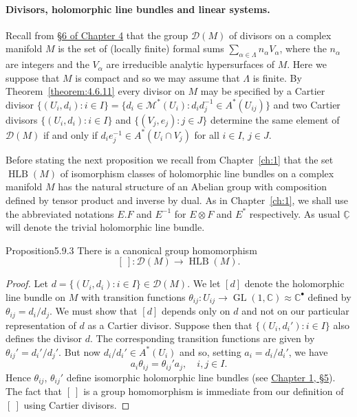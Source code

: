 \paragraph{Divisors, holomorphic line bundles and linear systems.}
Recall from \hyperref[sec:4:6]{\S6 of Chapter 4} that the group $\mathcal D(M)$ of divisors on a complex manifold $M$ is the set of (locally finite) formal sums $\sum_{\alpha\in\Lambda}n_\alpha V_\alpha$, where the $n_\alpha$ are integers and the $V_\alpha$ are irreducible analytic hypersurfaces of $M$. Here we suppose that $M$ is compact and so we may assume that $\Lambda$ is finite. By Theorem~\ref{theorem:4.6.11} every divisor on $M$ may be specified by a Cartier divisor $\{(U_i,d_i):i\in I\}=\{d_i\in\mathcal M^*(U_i):d_id_j^{-1}\in A^*(U_{ij})\}$ and two Cartier divisors $\{(U_i,d_i):i\in I\}$ and $\{(V_j,e_j):j\in J\}$ determine the same element of $\mathcal D(M)$ if and only if $d_ie_j^{-1}\in A^*(U_i\cap V_j)$ for all $i\in I$, $j\in J$.

Before stating the next proposition we recall from Chapter~\ref{ch:1} that the set $\operatorname{HLB}(M)$ of isomorphism classes of holomorphic line bundles on a complex manifold $M$ has the natural structure of an Abelian group with composition defined by tensor product and inverse by dual. As in Chapter~\ref{ch:1}, we shall use the abbreviated notations $E.F$ and $E^{-1}$ for $E\otimes F$ and $E^*$ respectively. As usual $\underline{\mathbb C}$ will denote the trivial holomorphic line bundle.
\begin{originaltheorem}{Proposition}{5.9.3}
There is a canonical group homomorphism
\[[\ ]:\mathcal D(M)\to\operatorname{HLB}(M).\]
\end{originaltheorem}
\begin{proof}
Let $d=\{(U_i,d_i):i\in I\}\in\mathcal D(M)$. We let $[d]$ denote the holomorphic line bundle on $M$ with transition functions $\theta_{ij}:U_{ij}\to\operatorname{GL}(1,\mathbb C)\approx\mathbb C^\bullet$ defined by $\theta_{ij}=d_i/d_j$. We must show that $[d]$ depends only on $d$ and not on our particular representation of $d$ as a Cartier divisor. Suppose then that $\{(U_i,d_i'):i\in I\}$ also defines the divisor $d$. The corresponding transition functions are given by $\theta_{ij}'=d_i'/d_j'$. But now $d_i/d_i'\in A^*(U_i)$ and so, setting $a_i=d_i/d_i'$, we have
\[a_i\theta_{ij}=\theta_{ij}'a_j,\quad i,j\in I.\]
Hence $\theta_{ij}$, $\theta_{ij}'$ define isomorphic holomorphic line bundles (see \hyperref[sec:1:5]{Chapter 1, \S5}). The fact that $[\ ]$ is a group homomorphism is immediate from our definition of $[\ ]$ using Cartier divisors.
\end{proof}
